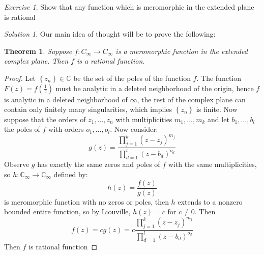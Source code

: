 \documentclass[notitlepage]{article}
\newtheorem{thm}{Theorem}
\theoremstyle{definition}
\theoremstyle{remark}
\newtheorem{exc}{Exercise}
\newtheorem*{sol}{Solution}
\newcommand{\set}[1]{\left\lbrace #1 \right\rbrace}
\newcommand{\CC}{\mathbb{C}}
\begin{document}
\begin{exc}
	Show that any function which is meromorphic in the extended plane is rational
\end{exc}
\begin{sol}
	Our main idea of thought will be to prove the following:
	\begin{thm}
		Suppose $ f: C_\infty \rightarrow C_\infty $ is a meromorphic function in the extended complex plane. Then $ f $ is a rational function.
	\end{thm}
	\begin{proof}
		Let $ \set{z_n} \in \CC $ be the set of the poles of the function $ f $. The function $ F(z) = f(\frac{1}{z}) $ must be analytic in a deleted neighborhood of the origin, hence $ f $ is analytic in a deleted neighborhood of $ \infty $, the rest of the complex plane can contain only finitely many singularities, which implies $ \set{z_n} $ is finite. Now suppose that the orders of $ z_1, \ldots, z_n $ with multiplicities $ m_1, \ldots, m_k $ and let $ b_1, \ldots, b_l $ the poles of $ f $ with orders $ o_1, \ldots, o_l $. Now consider:
		\[ g(z) = \frac{\prod_{j =1}^{k}(z- z_j)^{m_j}}{\prod_{d=1}^{l}(z - b_d)^{o_d} }\]
		Observe $ g $ has exactly the same zeros and poles of $ f $ with the same multiplicities, so $ h: \CC_\infty \rightarrow \CC_\infty $ defined by:
		\[ h(z) = \frac{f(z)}{g(z)} \]
		is meromorphic function with no zeros or poles, then $ h $ extends to a nonzero bounded entire function, so by Liouville, $ h(z) = c $ for $ c \neq 0 $. Then 
		\[ f(z) = c g(z) = c \frac{\prod_{j =1}^{k}(z- z_j)^{m_j}}{\prod_{d=1}^{l}(z - b_d)^{o_d} } \]
		Then $ f $ is rational function
	\end{proof}
\end{sol}
\end{document}
